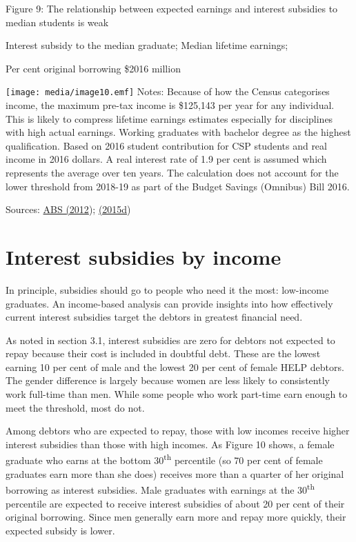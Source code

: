 \documentclass[]{book}
\begin{document}
\protect\hypertarget{_Ref311976904}{}{}Figure 9: The relationship between expected earnings and interest subsidies to median students is weak

Interest subsidy to the median graduate; Median lifetime earnings;

Per cent original borrowing \$2016 million

\texttt{[image: media/image10.emf]} Notes: Because of how the Census categorises income, the maximum pre-tax income is \$125,143 per year for any individual. This is likely to compress lifetime earnings estimates especially for disciplines with high actual earnings. Working graduates with bachelor degree as the highest qualification. Based on 2016 student contribution for CSP students and real income in 2016 dollars. A real interest rate of 1.9 per cent is assumed which represents the average over ten years. The calculation does not account for the lower threshold from 2018-19 as part of the Budget Savings (Omnibus) Bill 2016.

Sources: \protect\hyperlink{_ENREF_1}{ABS (2012}); \protect\hyperlink{_ENREF_5}{(2015d})

\section{Interest subsidies by income}\label{interest-subsidies-by-income}

In principle, subsidies should go to people who need it the most: low-income graduates. An income-based analysis can provide insights into how effectively current interest subsidies target the debtors in greatest financial need.

As noted in section 3.1, interest subsidies are zero for debtors not expected to repay because their cost is included in doubtful debt. These are the lowest earning 10 per cent of male and the lowest 20 per cent of female HELP debtors. The gender difference is largely because women are less likely to consistently work full-time than men. While some people who work part-time earn enough to meet the threshold, most do not.

Among debtors who are expected to repay, those with low incomes receive higher interest subsidies than those with high incomes. As Figure 10 shows, a female graduate who earns at the bottom 30\textsuperscript{th} percentile (so 70 per cent of female graduates earn more than she does) receives more than a quarter of her original borrowing as interest subsidies. Male graduates with earnings at the 30\textsuperscript{th} percentile are expected to receive interest subsidies of about 20 per cent of their original borrowing. Since men generally earn more and repay more quickly, their expected subsidy is lower.
\end{document}
